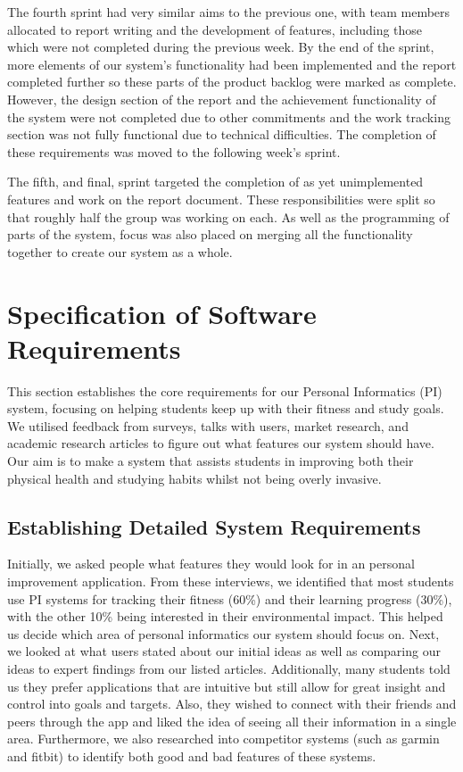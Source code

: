 \documentclass[12pt]{article}
\begin{document}
The fourth sprint had very similar aims to the previous one, with team members allocated to report writing and the development of features, including those which were not completed during the previous week. By the end of the sprint, more elements of our system's functionality had been implemented and the report completed further so these parts of the product backlog were marked as complete. However, the design section of the report and the achievement functionality of the system were not completed due to other commitments and the work tracking section was not fully functional due to technical difficulties. The completion of these requirements was moved to the following week's sprint.\par

The fifth, and final, sprint targeted the completion of as yet unimplemented features and work on the report document. These responsibilities were split so that roughly half the group was working on each. As well as the programming of parts of the system, focus was also placed on merging all the functionality together to create our system as a whole.


\newpage
\section{Specification of Software Requirements}

This section establishes the core requirements for our Personal Informatics
(PI) system, focusing on helping students keep up with their fitness and study
goals. We utilised feedback from surveys, talks with users, market research,
and academic research articles to figure out what features our system should have. Our
aim is to make a system that assists students in improving both their physical
health and studying habits whilst not being overly invasive.


\subsection{Establishing Detailed System Requirements}

Initially, we asked people what features they would look for in an personal
improvement application. From these interviews, we identified that most students use PI systems for
tracking their fitness (60\%) and their learning progress (30\%), with the other 10\% being interested in their environmental impact. This
helped us decide which area of personal informatics our system should focus on. Next, we looked
at what users stated about our initial ideas as well as comparing our ideas
to expert findings from our listed articles. Additionally, many students told us they prefer applications
that are intuitive but still allow for great insight and control into goals
and targets. Also, they wished to connect with their friends and peers through the app and
liked the idea of seeing all their information in a single area. Furthermore, we also researched into competitor 
systems (such as garmin and fitbit) to identify both good and bad features of these systems.\par
\end{document}
